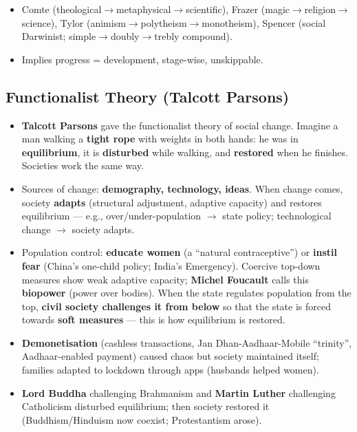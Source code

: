 \begin{QuickRevision}
\begin{itemize}
    \item Comte (theological$\rightarrow$metaphysical$\rightarrow$scientific), Frazer (magic$\rightarrow$religion$\rightarrow$science), Tylor (animism$\rightarrow$polytheism$\rightarrow$monotheism), Spencer (social Darwinist; simple$\rightarrow$doubly$\rightarrow$trebly compound).
    \item Implies progress = development, stage-wise, unskippable.
\end{itemize}
\end{QuickRevision}

\sectiondivider

\subsection{Functionalist Theory (Talcott Parsons)}

\begin{KeyConcept}
\begin{itemize}
    \item \textbf{Talcott Parsons} gave the functionalist theory of social change. Imagine a man walking a \textbf{tight rope} with weights in both hands: he was in \textbf{equilibrium}, it is \textbf{disturbed} while walking, and \textbf{restored} when he finishes. Societies work the same way.
    \item Sources of change: \textbf{demography, technology, ideas}. When change comes, society \textbf{adapts} (structural adjustment, adaptive capacity) and restores equilibrium --- e.g., over/under-population $\rightarrow$ state policy; technological change $\rightarrow$ society adapts.
    \item Population control: \textbf{educate women} (a ``natural contraceptive'') or \textbf{instil fear} (China's one-child policy; India's Emergency). Coercive top-down measures show weak adaptive capacity; \textbf{Michel Foucault} calls this \textbf{biopower} (power over bodies). When the state regulates population from the top, \textbf{civil society challenges it from below} so that the state is forced towards \textbf{soft measures} --- this is how equilibrium is restored.
\end{itemize}
\end{KeyConcept}

\begin{ExampleBox}
\begin{itemize}
    \item \textbf{Demonetisation} (cashless transactions, Jan Dhan-Aadhaar-Mobile ``trinity'', Aadhaar-enabled payment) caused chaos but society maintained itself; families adapted to lockdown through apps (husbands helped women).
    \item \textbf{Lord Buddha} challenging Brahmanism and \textbf{Martin Luther} challenging Catholicism disturbed equilibrium; then society restored it (Buddhism/Hinduism now coexist; Protestantism arose).
\end{itemize}
\end{ExampleBox}

